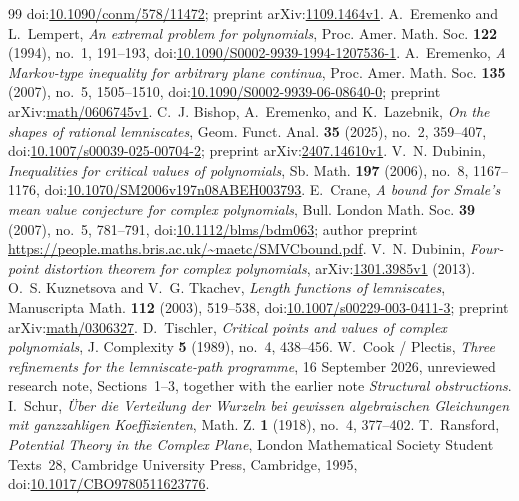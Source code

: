 \documentclass[11pt]{article}
\begin{document}
\begin{thebibliography}{99}
  doi:\href{https://doi.org/10.1090/conm/578/11472}{10.1090/conm/578/11472};
  preprint arXiv:\href{https://arxiv.org/abs/1109.1464v1}{1109.1464v1}.
 A.~Eremenko and L.~Lempert,
  \emph{An extremal problem for polynomials}, Proc. Amer. Math. Soc.
  \textbf{122} (1994), no.~1, 191--193,
  doi:\href{https://doi.org/10.1090/S0002-9939-1994-1207536-1}
  {10.1090/S0002-9939-1994-1207536-1}.
 A.~Eremenko,
  \emph{A Markov-type inequality for arbitrary plane continua},
  Proc. Amer. Math. Soc. \textbf{135} (2007), no.~5, 1505--1510,
  doi:\href{https://doi.org/10.1090/S0002-9939-06-08640-0}
  {10.1090/S0002-9939-06-08640-0};
  preprint arXiv:\href{https://arxiv.org/abs/math/0606745v1}{math/0606745v1}.
 C.~J. Bishop, A.~Eremenko, and
  K.~Lazebnik, \emph{On the shapes of rational lemniscates}, Geom. Funct.
  Anal. \textbf{35} (2025), no.~2, 359--407,
  doi:\href{https://doi.org/10.1007/s00039-025-00704-2}
  {10.1007/s00039-025-00704-2};
  preprint arXiv:\href{https://arxiv.org/abs/2407.14610v1}{2407.14610v1}.
 V.~N. Dubinin,
  \emph{Inequalities for critical values of polynomials}, Sb. Math.
  \textbf{197} (2006), no.~8, 1167--1176,
  doi:\href{https://doi.org/10.1070/SM2006v197n08ABEH003793}{10.1070/SM2006v197n08ABEH003793}.
 E.~Crane,
  \emph{A bound for Smale's mean value conjecture for complex polynomials},
  Bull. London Math. Soc. \textbf{39} (2007), no.~5, 781--791,
  doi:\href{https://doi.org/10.1112/blms/bdm063}{10.1112/blms/bdm063};
  author preprint \url{https://people.maths.bris.ac.uk/~maetc/SMVCbound.pdf}.
 V.~N. Dubinin,
  \emph{Four-point distortion theorem for complex polynomials},
  arXiv:\href{https://arxiv.org/abs/1301.3985v1}{1301.3985v1} (2013).
 O.~S. Kuznetsova and V.~G. Tkachev,
  \emph{Length functions of lemniscates}, Manuscripta Math.
  \textbf{112} (2003), 519--538,
  doi:\href{https://doi.org/10.1007/s00229-003-0411-3}{10.1007/s00229-003-0411-3};
  preprint arXiv:\href{https://arxiv.org/abs/math/0306327}{math/0306327}.
 D.~Tischler,
  \emph{Critical points and values of complex polynomials},
  J. Complexity \textbf{5} (1989), no.~4, 438--456.
 W.~Cook / Plectis,
  \emph{Three refinements for the lemniscate-path programme}, 16 September 2026,
  unreviewed research note, Sections~1--3, together with the earlier
  note \emph{Structural obstructions}.
 I.~Schur,
  \emph{\"Uber die Verteilung der Wurzeln bei gewissen algebraischen
  Gleichungen mit ganzzahligen Koeffizienten}, Math. Z. \textbf{1}
  (1918), no.~4, 377--402.
 T.~Ransford,
  \emph{Potential Theory in the Complex Plane}, London Mathematical Society
  Student Texts~28, Cambridge University Press, Cambridge, 1995,
  doi:\href{https://doi.org/10.1017/CBO9780511623776}{10.1017/CBO9780511623776}.
\end{thebibliography}
\end{document}
